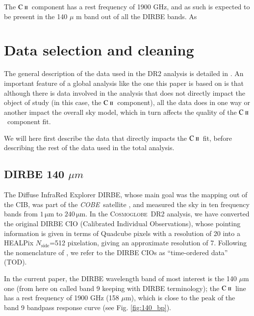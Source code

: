 \documentclass{aa}
\newcommand{\mathsc}[1]{{\normalfont\textsc{#1}}}
\def\Cosmoglobe{\textsc{Cosmoglobe}}
\def\COBE{\textit{COBE}}
\def\nside{$N_{\mathrm{side}}$}
\newcommand{\cii}{\ensuremath{\mathsc {C\ ii}}}
\begin{document}
The \cii\ component has a rest frequency of 1900 GHz, and as such is expected
to be present in the 140 $\mu$ m band out of all the DIRBE bands. As 

\clearpage
\section{Data selection and cleaning}
The general description of the data used in the DR2 analysis is detailed in
\citet{CG02_01}. An important feature of a global analysis like the one this
paper is based on is that although there is data involved in the analysis that
does not directly impact the object of study (in this case, the \cii\
component), all the data does in one way or another impact the overall sky
model, which in turn affects the quality of the \cii\ component fit.

We will here first describe the data that directly impacts the \cii\ fit,
before describing the rest of the data used in the total analysis.

\subsection{DIRBE 140 $\mu m$}
The Diffuse InfraRed Explorer DIRBE, whose main goal was the mapping out of the
CIB, was part of the \COBE\ satellite \citep{boggess92, silverberg93}, and
measured the sky in ten frequency bands from $1\,\mathrm{\mu m}$ to
$240\,\mathrm{\mu m}$. In the \Cosmoglobe\ DR2 analysis, we have converted the
original DIRBE CIO (Calibrated Individual Observations), whose pointing
information is given in terms of Quadcube pixels with a resolution of 20\arcs
into a HEALPix \nside=512 pixelation, giving an approximate resolution of
7\arcm. Following the nomenclature of \citet{CG02_01}, we refer to the DIRBE
CIOs as ``time-ordered data'' (TOD).

In the current paper, the DIRBE wavelength band of most interest is the 140
$\mu$m one (from here on called band 9 keeping with DIRBE terminology); the
\cii\ line has a rest frequency of 1900 GHz (158 $\mu$m), which is close to the
peak of the band 9 bandpass response curve (see Fig. \ref{fig:140_bp}).
\end{document}
